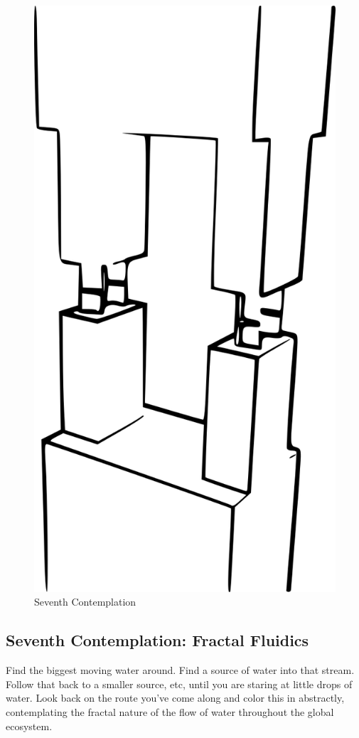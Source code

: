 \begin{figure}[htbp]
\centering
\includegraphics{images/contemplations/contemplation7C.png}
\caption{Seventh Contemplation}
\end{figure}

\subsection{Seventh Contemplation: Fractal
Fluidics}\label{seventh-contemplation-fractal-fluidics}

Find the biggest moving water around. Find a source of water into that
stream. Follow that back to a smaller source, etc, until you are staring
at little drops of water. Look back on the route you've come along and
color this in abstractly, contemplating the fractal nature of the flow
of water throughout the global ecosystem.
